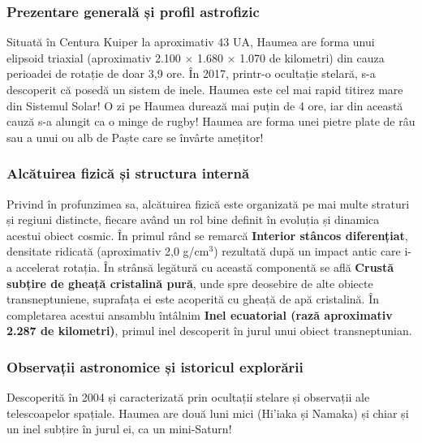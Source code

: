\subsubsection*{Prezentare generală și profil astrofizic}
Situată în Centura Kuiper la aproximativ 43 UA, Haumea are forma unui elipsoid triaxial (aproximativ 2.100 $\times$ 1.680 $\times$ 1.070 de kilometri) din cauza perioadei de rotație de doar 3,9 ore. În 2017, printr-o ocultație stelară, s-a descoperit că posedă un sistem de inele. Haumea este cel mai rapid titirez mare din Sistemul Solar! O zi pe Haumea durează mai puțin de 4 ore, iar din această cauză s-a alungit ca o minge de rugby! Haumea are forma unei pietre plate de râu sau a unui ou alb de Paște care se învârte amețitor!

\subsubsection*{Alcătuirea fizică și structura internă}
Privind în profunzimea sa, alcătuirea fizică este organizată pe mai multe straturi și regiuni distincte, fiecare având un rol bine definit în evoluția și dinamica acestui obiect cosmic. În primul rând se remarcă \textbf{Interior stâncos diferențiat}, densitate ridicată (aproximativ 2,0 g/cm$^3$) rezultată după un impact antic care i-a accelerat rotația. În strânsă legătură cu această componentă se află \textbf{Crustă subțire de gheață cristalină pură}, unde spre deosebire de alte obiecte transneptuniene, suprafața ei este acoperită cu gheață de apă cristalină. În completarea acestui ansamblu întâlnim \textbf{Inel ecuatorial (rază aproximativ 2.287 de kilometri)}, primul inel descoperit în jurul unui obiect transneptunian.

\subsubsection*{Observații astronomice și istoricul explorării}
Descoperită în 2004 și caracterizată prin ocultații stelare și observații ale telescoapelor spațiale. Haumea are două luni mici (Hi'iaka și Namaka) și chiar și un inel subțire în jurul ei, ca un mini-Saturn!

